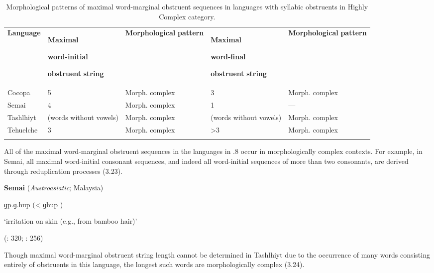\begin{table}
\begin{tabularx}{\textwidth}{XXXXX}
\lsptoprule

\textbf{Language} & { \textbf{Maximal} }

{ \textbf{word-initial} }

 \textbf{obstruent} \textbf{string} & \textbf{Morphological} \textbf{pattern} & { \textbf{Maximal} }

{ \textbf{word-final} }

 \textbf{obstruent} \textbf{string} & \textbf{Morphological} \textbf{pattern}\\
Cocopa & 5 & Morph. complex & 3 & Morph. complex\\
Semai & 4 & Morph. complex & 1 & —\\
Tashlhiyt & (words without vowels) & Morph. complex & (words without vowels) & Morph. complex\\
Tehuelche & 3 & Morph. complex & >3 & Morph. complex\\
\lspbottomrule
\end{tabularx}
\caption{\label{3.8}Morphological patterns of maximal word-marginal obstruent sequences in languages with syllabic obstruents in Highly Complex category.}
\end{table}




  All of the maximal word-marginal obstruent sequences in the languages in .8 occur in morphologically complex contexts. For example, in Semai, all maximal word-initial consonant sequences, and indeed all word-initial sequences of more than two consonants, are derived through reduplication processes (3.23).



\ea\label{ex:(3.23)}
  \textbf{Semai} (\textit{Austroasiatic}; Malaysia)



ɡp.ɡ.hup (< ɡhup )



‘irritation on skin (e.g., from bamboo hair)’



(\citealt{Sloan1988}: 320; \citealt{Diffloth1976a}: 256)

\z


Though maximal word-marginal obstruent string length cannot be determined in Tashlhiyt due to the occurrence of many words consisting entirely of obstruents in this language, the longest such words are morphologically complex (3.24).



